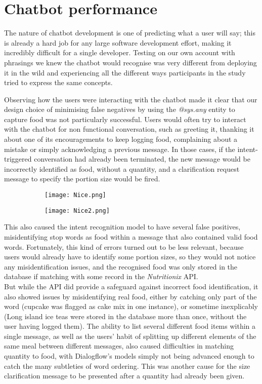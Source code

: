 \section{Chatbot performance}
The nature of chatbot development is one of predicting what a user will say; this is already a hard job for any large software development effort, making it incredibly difficult for a single developer.
Testing on our own account with phrasings we knew the chatbot would recognise was very different from deploying it in the wild and experiencing all the different ways participants in the study tried to express the same concepts.

Observing how the users were interacting with the chatbot made it clear that our design choice of minimising false negatives by using the \textit{@sys.any} entity to capture food was not particularly successful. Users would often try to interact with the chatbot for non functional conversation, such as greeting it, thanking it about one of its encouragements to keep logging food, complaining about a mistake or simply acknowledging a previous message. In those cases, if the intent-triggered conversation had already been terminated, the new message would be incorrectly identified as food, without a quantity, and a clarification request message to specify the portion size would be fired. \\
\begin{figure}[h!]
  \centering
  \begin{subfigure}[b]{\linewidth}
    \texttt{[image: Nice.png]}
  \end{subfigure}
  \begin{subfigure}[b]{\linewidth}
    \texttt{[image: Nice2.png]}
  \end{subfigure}
\end{figure}
This also caused the intent recognition model to have several false positives, misidentifying stop words as food within a message that also contained valid food words. Fortunately, this kind of errors turned out to be less relevant, because users would already have to identify some portion sizes, so they would not notice any misidentification issues, and the recognised food was only stored in the database if matching with some record in the \textit{Nutritionix} API. \\
But while the API did provide a safeguard against incorrect food identification, it also showed issues by misidentifying real food, either by catching only part of the word (cupcake was flagged as cake mix in one instance), or sometime inexplicably (Long island ice teas were stored in the database more than once, without the user having logged them). The ability to list several different food items within a single message, as well as the users' habit of splitting up different elements of the same meal between different messages, also caused difficulties in matching quantity to food, with Dialogflow's models simply not being advanced enough to catch the many subtleties of word ordering. This was another cause for the size clarification message to be presented after a quantity had already been given.

